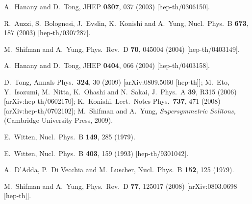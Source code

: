 \documentclass[epsfig,12pt]{article}
\begin{document}
{\newpage
\vspace{2.5cm}

\small
\begin{thebibliography}{99}
\itemsep -2pt

A.~Hanany and D.~Tong,
JHEP {\bf 0307}, 037 (2003)
[hep-th/0306150].

R.~Auzzi, S.~Bolognesi, J.~Evslin, K.~Konishi and A.~Yung,
Nucl.\ Phys.\ B {\bf 673}, 187 (2003)
[hep-th/0307287].

M.~Shifman and A.~Yung,
Phys.\ Rev.\ D {\bf 70}, 045004 (2004)
[hep-th/0403149].

A.~Hanany and D.~Tong,
JHEP {\bf 0404}, 066 (2004)
[hep-th/0403158].

D.~Tong,
  Annals Phys.\  {\bf 324}, 30 (2009)
  [arXiv:0809.5060 [hep-th]];
  M.~Eto, Y.~Isozumi, M.~Nitta, K.~Ohashi and N.~Sakai,
  J.\ Phys.\ A  {\bf 39}, R315 (2006)
  [arXiv:hep-th/0602170];
  K.~Konishi,
  Lect.\ Notes Phys.\  {\bf 737}, 471 (2008)
  [arXiv:hep-th/0702102];
M.~Shifman and A.~Yung,
{\sl Supersymmetric Solitons,}
(Cambridge University Press, 2009).

E.~Witten,
Nucl.\ Phys.\ B {\bf 149}, 285 (1979).

E.~Witten,
  Nucl.\ Phys.\ B {\bf 403}, 159 (1993)
  [hep-th/9301042].
  
  A.~D'Adda, P.~Di Vecchia and M.~Luscher,
  Nucl.\ Phys.\  B {\bf 152}, 125 (1979).
  
  M.~Shifman and A.~Yung,
  Phys.\ Rev.\  D {\bf 77}, 125017 (2008)
  [arXiv:0803.0698 [hep-th]].
  

\end{thebibliography}}
\end{document}
